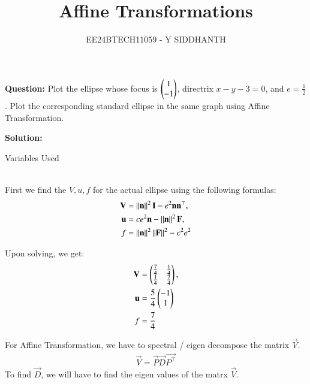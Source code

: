 \documentclass[journal]{IEEEtran}
\begin{document}
\onecolumn

\vspace{3cm}

\renewcommand{\thetable}{\theenumi}

\title{Affine Transformations}
\author{EE24BTECH11059 -  Y SIDDHANTH}
\maketitle

\renewcommand{\thetable}{\theenumi} 

\setcounter{section}{1}
\textbf{Question: } Plot the ellipse whose focus is $\begin{pmatrix}1 \\ -1\end{pmatrix}$, directrix $x-y-3 = 0$, and $e = \frac{1}{2}$. Plot the corresponding standard ellipse in the same graph using Affine Transformation.

\bigskip

\textbf{Solution: } 
\begin{table}[h!]    
	\centering
	
	\caption{Variables Used}
	\label{tab1-1.9-6}
\end{table}\\

First we find the $V, u, f$ for the actual ellipse using the following formulas: 
\begin{align}
	\mathbf{V} &=\left\lVert\mathbf{n}\right\rVert^2\mathbf{I}-e^2\mathbf{n}\mathbf{n}^{\top}, 
	\\
	\mathbf{u} &= ce^2\mathbf{n}-\left\lVert\mathbf{n}\right\rVert^2\mathbf{F}, 
	\\
	f &= \left\lVert\mathbf{n}\right\rVert^2\left\lVert\mathbf{F}\right\rVert^2-c^2e^2
\end{align}

Upon solving, we get:
\begin{align}
	\mathbf{V} &= \begin{pmatrix}\frac{7}{4} & \frac{1}{4} \\ \frac{1}{4} & \frac{7}{4}\end{pmatrix} ,
	\\
	\mathbf{u} &=\frac{5}{4}  \begin{pmatrix} -1 \\ 1\end{pmatrix}
	\\
	f &= \frac{7}{4}
\end{align}

For Affine Transformation, we have to spectral / eigen decompose the matrix $\vec{V}$. \\ 

\begin{align}
	\vec{V} = \vec{P}\vec{D}\vec{P^\top}
\end{align}
To find $\vec{D}$, we will have to find the eigen values of the matrx $\vec{V}$.
\end{document}
